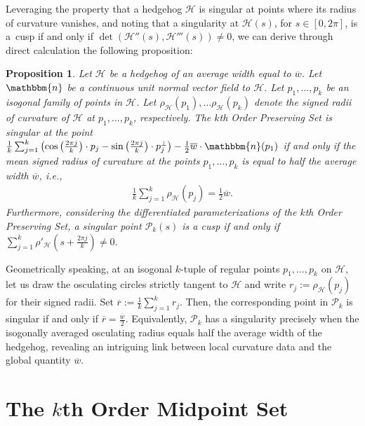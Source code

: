 \documentclass{amsart}
\newtheorem{prop}[thm]{Proposition}
\theoremstyle{definition}
\numberwithin{equation}{section}
\begin{document}
Leveraging the property that a hedgehog $\mathcal{H}$ is singular at points where its radius of curvature vanishes, and noting that a singularity at $\mathcal{H}(s)$, for $s \in [0, 2\pi]$, is a~cusp if and only if  $\det\left(\mathcal{H}''(s), \mathcal{H}'''(s)\right)\neq 0$, we can derive through direct calculation the following proposition:
\begin{prop}\label{SingCor}
Let $\mathcal{H}$ be a hedgehog of an average width equal to $\overline{w}$. Let $ \mathbbm{n}$ be a continuous unit normal vector field to $\mathcal{H}$.  Let $p_1,\ldots, p_k$ be an isogonal family of points in $\mathcal{H}$. Let $\rho_{\mathcal{H}}(p_1),\ldots \rho_{\mathcal{H}}(p_k)$ denote the signed radii of curvature of $\mathcal{H}$ at $p_1,\ldots, p_k$, respectively. The $k$th Order Preserving Set is singular at the point $\frac{1}{k}\sum_{j=1}^{k}\left(\cos\left(\frac{2\pi j}{k}\right)\cdot p_j-\sin\left(\frac{2\pi j}{k}\right)\cdot p_j^\perp  \right) -\frac{1}{2}\overline{w}\cdot \mathbbm{n}(p_1)$ if and only if the mean signed radius of curvature at the points $p_1,\ldots, p_k$ is equal to half the average width $\overline{w}$, i.e.,
\begin{align}\label{SingCondition}
\frac{1}{k}\sum_{j=1}^{k} \rho_{\mathcal{H}}\left(p_j\right) = \frac{1}{2}\overline{w}.
\end{align}
Furthermore, considering the differentiated parameterizations of the $k$th Order Preserving Set, a singular point $\mathcal{P}_k(s) $ is a cusp if and only if $\sum_{j=1}^{k}\rho'_{\mathcal{H}}\left(s+\frac{2\pi j}{k}\right) \neq 0$.
\end{prop}

Geometrically speaking, at an isogonal $k$-tuple of regular points $p_1,\ldots,p_k$ on $\mathcal H$, let us draw the
osculating circles strictly tangent to $\mathcal H$ and write
$r_j:=\rho_{\mathcal H}(p_j)$ for their signed radii. Set
$\overline{r}:=\frac{1}{k}\sum_{j=1}^k r_j$.
Then, the corresponding point in $\mathcal P_k$ is singular if and only if
$\overline{r}=\frac{\overline w}{2}$. Equivalently, $\mathcal P_k$ has a singularity precisely when the
isogonally averaged osculating radius equals half the average width of
the hedgehog, revealing an intriguing link between local curvature data
and the global quantity $\overline w$.


\section{The $k$th Order Midpoint Set} \label{sec4}
\end{document}
